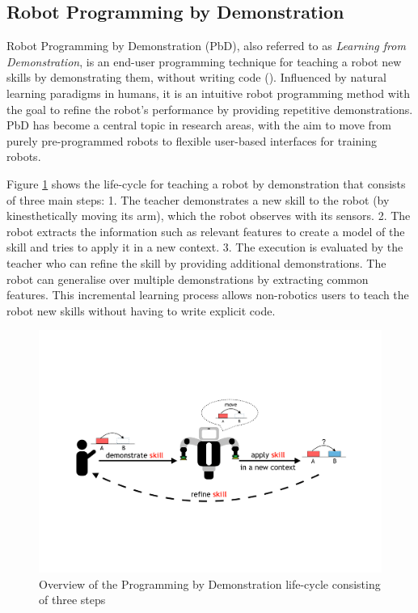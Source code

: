 \subsection{Robot Programming by Demonstration}
Robot Programming by Demonstration (PbD), also referred to as \textit{Learning from Demonstration}, is an end-user programming technique for teaching a robot new skills by demonstrating them, without writing code (\cite{billard2008robot}).
Influenced by natural learning paradigms in humans, it is an intuitive robot programming method with the goal to refine the robot's performance by providing repetitive demonstrations.
PbD has become a central topic in research areas, with the aim to move from purely pre-programmed robots to flexible user-based interfaces for training robots.

Figure \ref{fig:Principle Overview} shows the life-cycle for teaching a robot by demonstration that consists of three main steps:
1. The teacher demonstrates a new skill to the robot (\eg by kinesthetically moving its arm), which the robot observes with its sensors. 2.
The robot %
extracts the information such as relevant features to create a model of the skill and tries to apply it in a new context.
3. The execution is evaluated by the teacher who can refine the skill by providing additional demonstrations.
The robot can generalise over multiple demonstrations by extracting common features. %
This incremental learning process allows non-robotics users to teach the robot new skills without having to write explicit code.

\begin{figure}[h]
	\centering
	\includegraphics[width=0.75\linewidth]{figures/PbD-Overview}
	\caption{Overview of the Programming by Demonstration life-cycle consisting of three steps}
	\label{fig:Principle Overview}
\end{figure}

